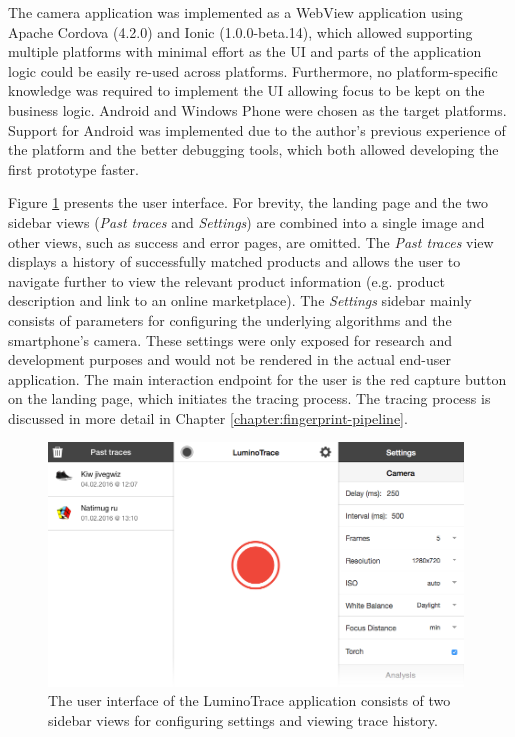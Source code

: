 \documentclass[thesis.tex]{subfiles}
\begin{document}
The camera application was implemented as a WebView application using Apache Cordova (4.2.0) and Ionic (1.0.0-beta.14), which allowed supporting multiple platforms with minimal effort as the UI and parts of the application logic could be easily re-used across platforms. Furthermore, no platform-specific knowledge was required to implement the UI allowing focus to be kept on the business logic. Android and Windows Phone were chosen as the target platforms. Support for Android was implemented due to the author's previous experience of the platform and the better debugging tools, which both allowed developing the first prototype faster.

Figure \ref{figure:user_interface} presents the user interface. For brevity, the landing page and the two sidebar views (\emph{Past traces} and \emph{Settings}) are combined into a single image and other views, such as success and error pages, are omitted. The \emph{Past traces} view displays a history of successfully matched products and allows the user to navigate further to view the relevant product information (e.g. product description and link to an online marketplace). The \emph{Settings} sidebar mainly consists of parameters for configuring the underlying algorithms and the smartphone's camera. These settings were only exposed for research and development purposes and would not be rendered in the actual end-user application. The main interaction endpoint for the user is the red capture button on the landing page, which initiates the tracing process. The tracing process is discussed in more detail in Chapter \ref{chapter:fingerprint-pipeline}.

\begin{figure}[h]
\centering \includegraphics[width=0.98\textwidth,height=\textheight,keepaspectratio=true]{images/design_implementation/user_interface}
\vspace{-4mm}
\caption{The user interface of the LuminoTrace application consists of two sidebar views for configuring settings and viewing trace history. \label{figure:user_interface}}
\end{figure}
\end{document}
